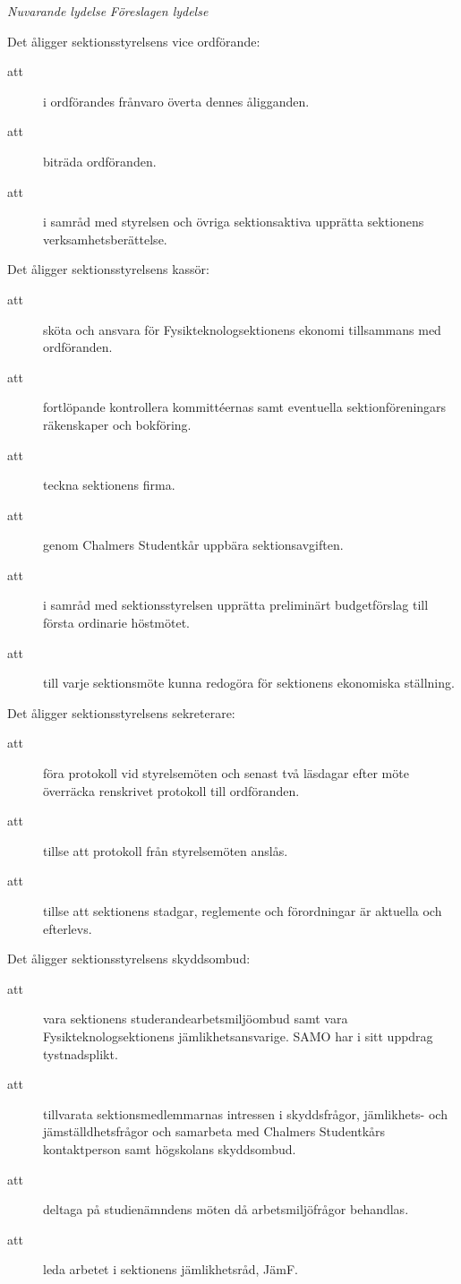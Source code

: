 \documentclass{article}
\newenvironment{lydelse}
    {\begin{paracol}{2}%
        \emph{Nuvarande lydelse}%
        \switchcolumn%
        \emph{Föreslagen lydelse}%
    \end{paracol}%
    \begin{enumerate}[label=\thesubsection.\arabic*]%
    \begin{paracol}{2}%
    }{\end{paracol}\end{enumerate}}
\begin{document}
\begin{lydelse}
    \item Det åligger sektionsstyrelsens vice ordförande:
	\begin{description}
		\item[att] i ordförandes frånvaro överta dennes åligganden.
		\item[att] biträda ordföranden.
		\item[att] i samråd med styrelsen och övriga sektionsaktiva upprätta sektionens verksamhetsberättelse.
	\end{description}

    \item Det åligger sektionsstyrelsens  kassör:
	\begin{description}
		\item[att] sköta och ansvara för Fysikteknologsektionens ekonomi tillsammans med ordföranden.
		\item[att] fortlöpande kontrollera kommittéernas samt eventuella sektionföreningars räkenskaper och bokföring.
		\item[att] teckna sektionens firma.
		\item[att] genom Chalmers Studentkår uppbära sektionsavgiften.
		\item[att] i samråd med sektionsstyrelsen upprätta preliminärt budgetförslag till första ordinarie höstmötet.
		\item[att] till varje sektionsmöte kunna redogöra för sektionens ekonomiska ställning.
	\end{description}

    \item Det åligger sektionsstyrelsens sekreterare:
	\begin{description}
		\item[att] föra protokoll vid styrelsemöten och senast två läsdagar efter möte överräcka renskrivet protokoll till ordföranden.
		\item[att] tillse att protokoll från styrelsemöten anslås.
		\item[att] tillse att sektionens stadgar, reglemente och förordningar är aktuella och efterlevs.
	\end{description}

    \item Det åligger sektionsstyrelsens skyddsombud:
	\begin{description}
		\item[att] vara sektionens studerandearbetsmiljöombud samt vara Fysikteknologsektionens jämlikhetsansvarige. SAMO har i sitt uppdrag tystnadsplikt.
		\item[att] tillvarata sektionsmedlemmarnas intressen i skyddsfrågor, jämlikhets- och jämställdhetsfrågor och samarbeta med Chalmers Studentkårs kontaktperson samt högskolans skyddsombud.
		\item[att] deltaga på studienämndens möten då arbetsmiljöfrågor behandlas.
		\item[att] leda arbetet i sektionens jämlikhetsråd, JämF.
	\end{description}


\end{lydelse}
\end{document}

